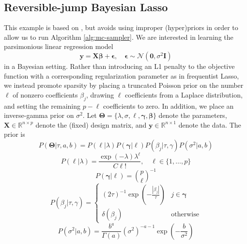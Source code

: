 \documentclass[a4paper,11pt]{article}
\begin{document}
\subsection{Reversible-jump Bayesian Lasso}
This example is based on \cite{chen_bayesian_2011}, but avoids using improper (hyper)priors in order to allow us to run Algorithm \ref{alg:mc-sampler}. We are interested in learning the parsimonious linear regression model
\begin{equation}
  \mathbf{y} = \mathbf{X}\mathbf{\beta} + \mathbf{\epsilon}, \quad \mathbf{\epsilon} \sim \mathcal{N}(\mathbf{0}, \sigma^{2} \mathbf{I})
\end{equation}
in a Bayesian setting. Rather than introducing an L1 penalty to the objective function with a corresponding regularization parameter as in frequentist Lasso, we instead promote sparsity by placing a truncated Poisson prior on the number $\ell$ of nonzero coefficients $\beta_{j}$, drawing $\ell$ coefficients from a Laplace distribution, and setting the remaining $p-\ell$ coefficients to zero. In addition, we place an inverse-gamma prior on $\sigma^{2}$. Let $\mathbf{\Theta} = \{\lambda, \sigma, \ell, \mathbf{\gamma}, \mathbf{\beta}\}$ denote the parameters, $\mathbf{X} \in \mathbb{R}^{n \times p}$ denote the (fixed) design matrix, and $\mathbf{y} \in \mathbb{R}^{n \times 1}$ denote the data. The prior is
\begin{equation}
  P(\mathbf{\Theta}|\tau, a, b ) = P(\ell|\lambda) P(\mathbf{\gamma}|\ell) P(\beta_{j} | \tau, \gamma) P(\sigma^{2} | a, b)
\end{equation}
\begin{equation}
  P(\ell|\lambda) = \frac{\exp{(-\lambda)} \lambda^{\ell}}{C\ell!}, \quad \ell \in \{1,\ldots, p\}
\end{equation}
\begin{equation}
  P(\mathbf{\gamma}|\ell) = {p\choose \ell}^{-1}
\end{equation}
\begin{equation}
  P(\beta_{j} | \tau, \gamma ) = \begin{cases} (2\tau)^{-1}\exp(-\frac{|\beta_{j}|}{\tau}) & j \in \mathbf{\gamma} \\ \delta(\beta_{j}) & \text{otherwise} \end{cases}
\end{equation}
\begin{equation}
    P(\sigma^{2} | a, b) = \frac{b^{a}}{\Gamma(a)} (\sigma^{2})^{-a-1} \exp{\left(-\frac{b}{\sigma^{2}}\right)}
\end{equation}
\end{document}
